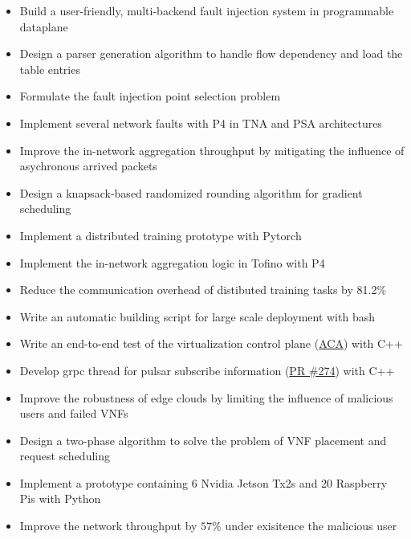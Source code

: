 \documentclass{resume}
\begin{document}
\begin{itemize}
  \item Build a user-friendly, multi-backend fault injection system in programmable dataplane
  \item Design a parser generation algorithm to handle flow dependency and load the table entries
  \item Formulate the fault injection point selection problem
  \item Implement several network faults with P4 in TNA and PSA architectures
\end{itemize}

\begin{itemize}
  \item Improve the in-network aggregation throughput by mitigating the influence of asychronous arrived packets
  \item Design a knapsack-based randomized rounding algorithm for gradient scheduling
  \item Implement a distributed training prototype with Pytorch 
  \item Implement the in-network aggregation logic in Tofino with P4
  \item Reduce the communication overhead of distibuted training tasks by 81.2\%
\end{itemize}

\begin{itemize}
  \item Write an automatic building script for large scale deployment with bash
  \item Write an end-to-end test of the virtualization control plane (\href{https://github.com/futurewei-cloud/alcor-control-agent}{ACA}) with C++
  \item Develop grpc thread for pulsar subscribe information (\href{https://github.com/futurewei-cloud/alcor-control-agent/pull/274}{PR \#274}) with C++
\end{itemize}

\begin{itemize}
  \item Improve the robustness of edge clouds by limiting the influence of malicious users and failed VNFs
  \item Design a two-phase algorithm to solve the problem of VNF placement and request scheduling
  \item Implement a prototype containing 6 Nvidia Jetson Tx2s and 20 Raspberry Pis with Python
  \item Improve the network throughput by $57\%$ under exisitence the malicious user
\end{itemize}
\end{document}
